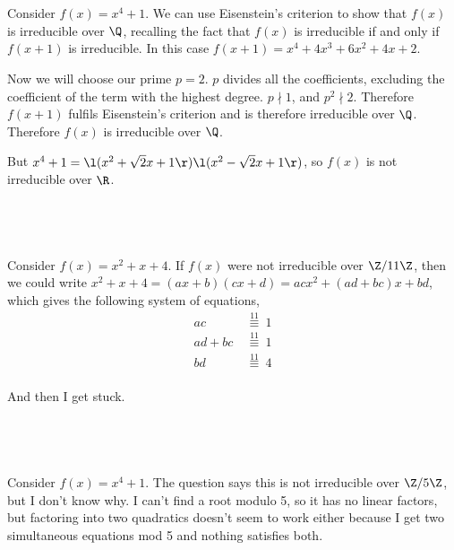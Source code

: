\documentclass[a4paper]{article}
\begin{document}
\subsection{~}

Consider $f(x) = x^4 + 1$. We can use Eisenstein's criterion to show that $f(x)$ is irreducible over $\Q$, recalling the fact that $f(x)$ is irreducible if and only if $f(x+1)$ is irreducible. In this case $f(x+1) = x^4 + 4x^3 + 6x^2 + 4x + 2$.

Now we will choose our prime $p=2$. $p$ divides all the coefficients, excluding the coefficient of the term with the highest degree. $p \nmid 1$, and $p^2 \nmid 2$. Therefore $f(x+1)$ fulfils Eisenstein's criterion and is therefore irreducible over $\Q$. Therefore $f(x)$ is irreducible over $\Q$.

But $x^4 + 1 = \l(x^2 + \sqrt2 x + 1\r) \l(x^2 - \sqrt2 x + 1\r)$, so $f(x)$ is not irreducible over $\R$.

\subsection{~}

Consider $f(x) = x^2 + x + 4$. If $f(x)$ were not irreducible over $\Z / 11 \Z$, then we could write $x^2 + x + 4 = (ax + b) (cx + d) = acx^2 + (ad + bc)x + bd$, which gives the following system of equations, \begin{align*}
	ac &\stackrel{11}{\ \equiv\ } 1\\
	ad + bc &\stackrel{11}{\ \equiv\ } 1\\
	bd &\stackrel{11}{\ \equiv\ } 4\\
\end{align*}

And then I get stuck.

\subsection{~}

Consider $f(x) = x^4 + 1$. The question says this is not irreducible over $\Z / 5 \Z$, but I don't know why. I can't find a root modulo 5, so it has no linear factors, but factoring into two quadratics doesn't seem to work either because I get two simultaneous equations mod 5 and nothing satisfies both.
\end{document}
